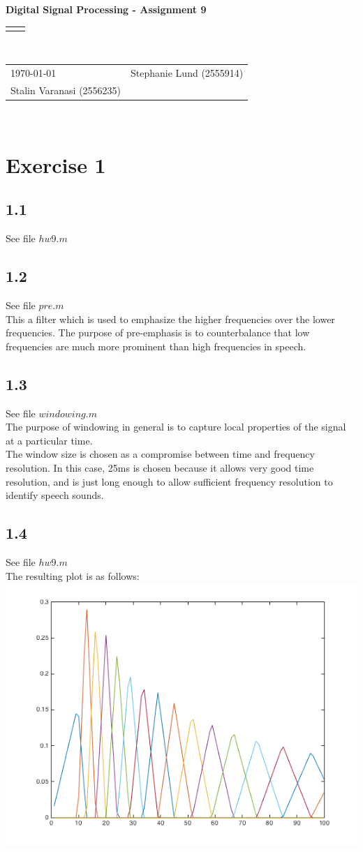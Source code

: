 \documentclass[12pt]{article}
\renewcommand{\title}[1]{\textbf{#1}\\}
\renewcommand{\line}{\begin{tabularx}{\textwidth}{X>{\raggedleft}X}\hline\\\end{tabularx}\\[-0.5cm]}
\newcommand{\leftright}[2]{\begin{tabularx}{\textwidth}{X>{\raggedleft}X}#1%
& #2\\\end{tabularx}\\[-0.5cm]}
\begin{document}
\title{Digital Signal Processing - Assignment 9}
\line
\leftright{\today}{Stephanie Lund (2555914)\\Stalin Varanasi (2556235)} %

\section*{Exercise 1}

\subsection*{1.1}
See file $hw9.m$

\subsection*{1.2}
See file $pre.m$\\

This a filter which is used to emphasize the higher frequencies over the lower frequencies. The purpose of pre-emphasis is to counterbalance that low frequencies are much more prominent than high frequencies in speech.

\subsection*{1.3}
See file $windowing.m$\\

The purpose of windowing in general is to capture local properties of the signal at a particular time.\\
The window size is chosen as a compromise between time and frequency resolution. In this case, 25ms is chosen because it allows very good time resolution, and is just long enough to allow sufficient frequency resolution to identify speech sounds.

\subsection*{1.4}
See file $hw9.m$\\

The resulting plot is as follows:\\
\includegraphics[scale=0.8]{hw9-1.png}
\end{document}
